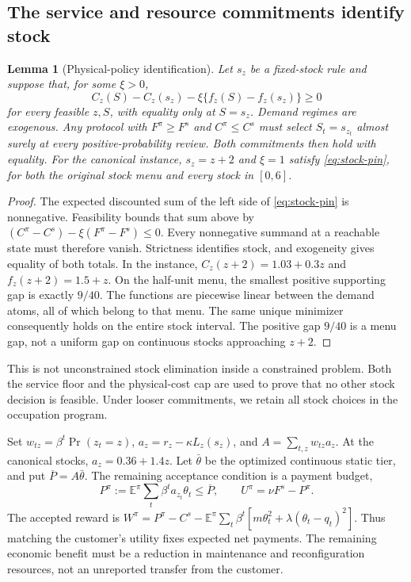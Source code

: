 \documentclass[11pt,letterpaper]{article}
\newtheorem{lemma}[theorem]{Lemma}
\theoremstyle{definition}
\newcommand{\E}{\mathbb E}
\newcommand{\1}{\mathbf 1}
\begin{document}
\subsection{The service and resource commitments identify stock}
\begin{lemma}[Physical-policy identification]\label{lem:stock-pin}
Let $s_z$ be a fixed-stock rule and suppose that, for some $\xi>0$,
\begin{equation}\label{eq:stock-pin}
 C_z(S)-C_z(s_z)-\xi\{f_z(S)-f_z(s_z)\}\geq0
\end{equation}
for every feasible $z,S$, with equality only at $S=s_z$. Demand regimes are exogenous. Any protocol with $F^\pi\geq F^s$ and $C^\pi\leq C^s$ must select $S_t=s_{z_t}$ almost surely at every positive-probability review. Both commitments then hold with equality. For the canonical instance, $s_z=z+2$ and $\xi=1$ satisfy \eqref{eq:stock-pin}, for both the original stock menu and every stock in $[0,6]$.
\end{lemma}
\begin{proof}
The expected discounted sum of the left side of \eqref{eq:stock-pin} is nonnegative. Feasibility bounds that sum above by $(C^\pi-C^s)-\xi(F^\pi-F^s)\leq0$. Every nonnegative summand at a reachable state must therefore vanish. Strictness identifies stock, and exogeneity gives equality of both totals. In the instance, $C_z(z+2)=1.03+0.3z$ and $f_z(z+2)=1.5+z$. On the half-unit menu, the smallest positive supporting gap is exactly $9/40$. The functions are piecewise linear between the demand atoms, all of which belong to that menu. The same unique minimizer consequently holds on the entire stock interval. The positive gap $9/40$ is a menu gap, not a uniform gap on continuous stocks approaching $z+2$.
\end{proof}
This is not unconstrained stock elimination inside a constrained problem. Both the service floor and the physical-cost cap are used to prove that no other stock decision is feasible. Under looser commitments, we retain all stock choices in the occupation program.

Set $w_{tz}=\beta^t\Pr(z_t=z)$, $a_z=r_z-\kappa L_z(s_z)$, and $A=\sum_{t,z}w_{tz}a_z$. At the canonical stocks, $a_z=0.36+1.4z$. Let $\bar\theta$ be the optimized continuous static tier, and put $\overline P=A\bar\theta$. The remaining acceptance condition is a payment budget,
\begin{equation}\label{eq:accepted-payment}
 P^\pi:=\E^\pi\sum_t\beta^t a_{z_t}\theta_t\leq\overline P,
 \qquad U^\pi=\nu F^s-P^\pi.
\end{equation}
The accepted reward is $W^\pi=P^\pi-C^s-\E^\pi\sum_t\beta^t[m\theta_t^2+\lambda(\theta_t-q_t)^2]$. Thus matching the customer's utility fixes expected net payments. The remaining economic benefit must be a reduction in maintenance and reconfiguration resources, not an unreported transfer from the customer.
\end{document}
